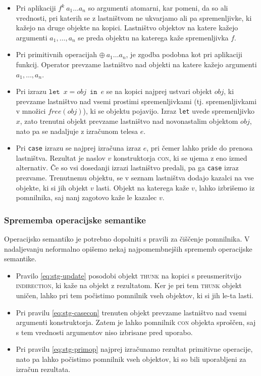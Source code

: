 \begin{itemize}
    \itemsep 0em
    \item Pri aplikaciji $f^k \: a_1 \dots a_n$ so argumenti atomarni, kar pomeni, da so ali  vrednosti, pri katerih se z lastništvom ne ukvarjamo ali pa spremenljivke, ki kažejo na druge objekte na kopici. Lastništvo objektov na katere kažejo argumenti $a_1, \dots, a_n$ se preda objektu na katerega kaže spremenljivka $f$.
    \item Pri primitivnih operacijah $\oplus \: a_1 \dots a_n$, je zgodba podobna kot pri aplikaciji funkcij. Operator prevzame lastništvo nad objekti na katere kažejo argumenti $a_1, \dots, a_n$.
    \item Pri izrazu $\texttt{let} \enspace x = obj \enspace \texttt{in} \enspace e$ se na kopici najprej ustvari objekt $obj$, ki prevzame lastništvo nad vsemi prostimi spremenljivkami (tj. spremenljivkami v množici $\textit{free}(obj)$), ki se  objektu pojavijo. Izraz \texttt{let} uvede spremenljivko $x$, zato trenutni objekt prevzame lastništvo nad novonastalim objektom $obj$, nato pa se nadaljuje z izračunom telesa $e$.
    \item Pri \texttt{case} izrazu se najprej izračuna  izraz $e$, pri čemer lahko pride do prenosa lastništva. Rezultat je naslov $v$ konstruktorja \textsc{con}, ki se ujema z eno izmed alternativ. Če so vsi dosedanji izrazi lastništvo predali, pa ga \texttt{case} izraz prezvame. Trenutnemu objektu, se v seznam lastništva dodajo kazalci na vse objekte, ki si jih objekt $v$ lasti. Objekt na katerega kaže $v$, lahko izbrišemo iz pomnilnika, saj nanj zagotovo kaže le kazalec $v$.
\end{itemize}

\subsubsection{Sprememba operacijske semantike}

Operacijsko semantiko je potrebno dopolniti s pravili za čiščenje pomnilnika. V nadaljevanju neformalno opišemo nekaj najpomembnejših sprememb operacijske semantike.

\begin{itemize}
    \itemsep 0em
    \item Pravilo \ref{eq:stg-update} posodobi objekt \textsc{thunk} na kopici s preusmeritvijo \textsc{indirection}, ki kaže na objekt z rezultatom. Ker je pri tem \textsc{thunk} objekt uničen, lahko pri tem počistimo pomnilnik vseh objektov, ki si jih le-ta lasti.
    \item Pri pravilu \ref{eq:stg-casecon} trenuten objekt prevzame lastništvo nad vsemi argumenti konstruktorja. Zatem je lahko pomnilnik \textsc{con} objekta spro\-ščen, saj s tem vrednosti argumentov niso izbrisane pred uporabo. 
    \item Pri pravilu \ref{eq:stg-primop} najprej izračunamo rezultat primitivne operacije, nato pa lahko počistimo pomnilnik vseh objektov, ki so bili uporabljeni za izračun rezultata.
\end{itemize}

